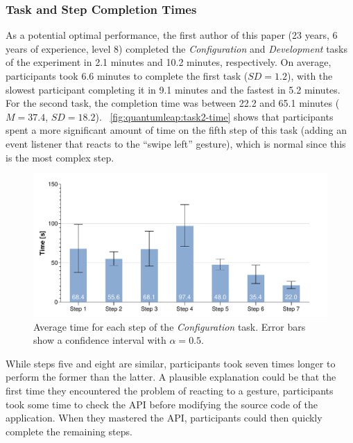 \subsubsection{Task and Step Completion Times}
As a potential optimal performance, the first author of this paper (23 years, 6 years of experience, level 8)  completed the \textit{Configuration} and \textit{Development} tasks of the experiment in 2.1 minutes and 10.2 minutes, respectively. On average, participants took 6.6 minutes to complete the first task ($SD{=}1.2$), with the slowest participant completing it in 9.1 minutes and the fastest in 5.2 minutes. For the second task, the completion time was between 22.2 and 65.1 minutes ($M{=}37.4$, $SD{=}18.2$). \fig~\ref{fig:quantumleap:task2-time} shows that participants spent a more significant amount of time on the fifth step of this task (\ie adding an event listener that reacts to the ``swipe left'' gesture), which is normal since this is the most complex step.

\begin{figure}[ht]
    \centering
    \includegraphics[width=.85\linewidth]{Figures/QuantumLeap/Evaluation/Task 1 (time).pdf}
    \vspace{-12pt}
    \caption{Average time for each step of the \textit{Configuration} task. Error bars show a confidence interval with $\alpha{=}0.5$.}
    \label{fig:quantumleap:task1-time}
    \vspace{-8pt}
\end{figure}


While steps five and eight are similar, participants took seven times longer to perform the former than the latter. A plausible explanation could be that the first time they encountered the problem of reacting to a gesture, participants took some time to check the API before modifying the source code of the application. When they mastered the API, participants could then quickly complete the remaining steps.


